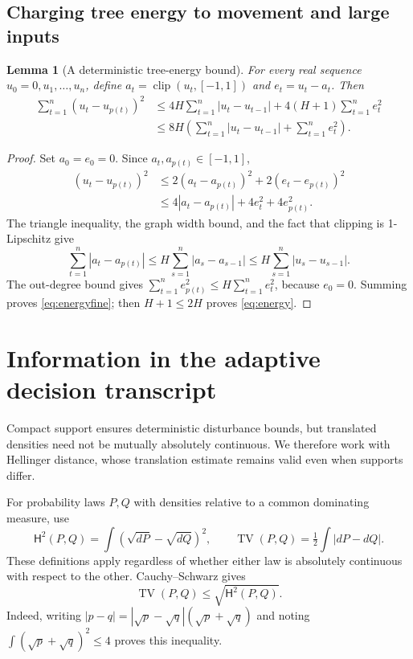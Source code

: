 \documentclass[11pt]{article}
\newtheorem{lemma}[theorem]{Lemma}
\theoremstyle{remark}
\newcommand{\TV}{\operatorname{TV}}
\newcommand{\clip}{\operatorname{clip}}
\newcommand{\HH}{\mathsf H}
\begin{document}
\subsection{Charging tree energy to movement and large inputs}

\begin{lemma}[A deterministic tree-energy bound]\label{lem:energy}
For every real sequence $u_0=0,u_1,\ldots,u_n$, define $a_t=\clip(u_t,[-1,1])$ and $e_t=u_t-a_t$. Then
\begin{align}
 \sum_{t=1}^n(u_t-u_{p(t)})^2
 &\le4H\sum_{t=1}^n|u_t-u_{t-1}|
      +4(H+1)\sum_{t=1}^n e_t^2\label{eq:energyfine}\\
 &\le8H\left(\sum_{t=1}^n|u_t-u_{t-1}|+\sum_{t=1}^n e_t^2\right).
 \label{eq:energy}
\end{align}
\end{lemma}
\begin{proof}
Set $a_0=e_0=0$. Since $a_t,a_{p(t)}\in[-1,1]$,
\begin{align*}
 (u_t-u_{p(t)})^2
 &\le2(a_t-a_{p(t)})^2+2(e_t-e_{p(t)})^2\\
 &\le4|a_t-a_{p(t)}|+4e_t^2+4e_{p(t)}^2.
\end{align*}
The triangle inequality, the graph width bound, and the fact that clipping is 1-Lipschitz give
\[
 \sum_{t=1}^n|a_t-a_{p(t)}|
 \le H\sum_{s=1}^n|a_s-a_{s-1}|
 \le H\sum_{s=1}^n|u_s-u_{s-1}|.
\]
The out-degree bound gives $\sum_{t=1}^n e_{p(t)}^2\le H\sum_{t=1}^n e_t^2$, because $e_0=0$. Summing proves \eqref{eq:energyfine}; then $H+1\le2H$ proves \eqref{eq:energy}.
\end{proof}

\section{Information in the adaptive decision transcript}\label{sec:information}

Compact support ensures deterministic disturbance bounds, but translated
densities need not be mutually absolutely continuous. We therefore work
with Hellinger distance, whose translation estimate remains valid even
when supports differ.

For probability laws $P,Q$ with densities relative to a common dominating measure, use
\[
 \HH^2(P,Q)=\int(\sqrt{dP}-\sqrt{dQ})^2,\qquad
 \TV(P,Q)=\tfrac12\int|dP-dQ|.
\]
These definitions apply regardless of whether either law is absolutely continuous with respect to the other. Cauchy--Schwarz gives
\begin{equation}\label{eq:tvhell}
 \TV(P,Q)\le\sqrt{\HH^2(P,Q)}.
\end{equation}
Indeed, writing $|p-q|=|\sqrt p-\sqrt q|(\sqrt p+\sqrt q)$ and noting $\int(\sqrt p+\sqrt q)^2\le4$ proves this inequality.
\end{document}
